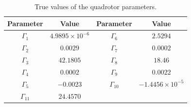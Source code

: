 \documentclass[3p]{elsarticle}
\begin{document}






\begin{table}[H]
    \renewcommand{\arraystretch}{1.3}
    \caption{True values of the quadrotor parameters.}
    \vspace{-0.5cm}
    \begin{center}
    \begin{tabular}{c c c c}
    \hline
    Parameter & Value & Parameter & Value  \\
    \hline
    $\Gamma_1$ & $4.9895 \times 10^{-6}$ & $\Gamma_6$ & $2.5294$ \\
    $\Gamma_2$ & $0.0029$ & $\Gamma_7$ & $0.0002$ \\
    $\Gamma_3$ & $42.1805$ & $\Gamma_8$ & $18.46$ \\
    $\Gamma_4$ & $0.0002$ & $\Gamma_9$ & $0.0022$ \\
    $\Gamma_5$ & $-0.0023$ & $\Gamma_{10}$ & $-1.4456 \times 10^{-5}$ \\
    $\Gamma_{11}$ & $24.4570$ & & \\
    \hline
    \end{tabular}
    \label{tab:true_parameters}
    \end{center}
\end{table}
\end{document}
